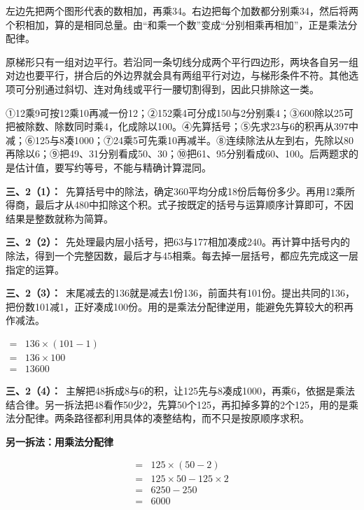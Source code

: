 \documentclass[multi=snippet,border=0pt]{standalone}
\newenvironment{snippet}[3]{\begin{minipage}{#1bp}\color{answerred}\fontsize{#2}{#3}\selectfont\raggedright}{\end{minipage}}
\begin{document}
\begin{snippet}{505}{11.5}{14}左边先把两个图形代表的数相加，再乘34。右边把每个加数都分别乘34，然后将两个积相加，算的是相同总量。由“和乘一个数”变成“分别相乘再相加”，正是乘法分配律。\end{snippet}
\begin{snippet}{505}{11.5}{14}原梯形只有一组对边平行。若沿同一条切线分成两个平行四边形，两块各自另一组对边也要平行，拼合后的外边界就会具有两组平行对边，与梯形条件不符。其他选项可分别通过斜切、连对角线或平行一腰切割得到，因此只排除这一类。\end{snippet}
\begin{snippet}{505}{11.5}{14}①12乘9可按12乘10再减一份12；②152乘4可分成150与2分别乘4；③600除以25可把被除数、除数同时乘4，化成除以100。④先算括号；⑤先求23与6的积再从397中减；⑥125与8凑1000；⑦24乘5可先乘10再减半。⑧连续除法从左到右，先除以80再除以6；⑨把49、31分别看成50、30；⑩把61、95分别看成60、100。后两题求的是估计值，要写约等号，不能与精确计算混同。\end{snippet}
\begin{snippet}{505}{11.5}{14}\textbf{三、2（1）：}\ 先算括号中的除法，确定360平均分成18份后每份多少。再用12乘所得商，最后才从480中扣除这个积。式子按既定的括号与运算顺序计算即可，不因结果是整数就称为简算。\end{snippet}
\begin{snippet}{505}{11.5}{14}\textbf{三、2（2）：}\ 先处理最内层小括号，把63与177相加凑成240。再计算中括号内的除法，得到一个完整因数，最后才与45相乘。每去掉一层括号，都应先完成这一层指定的运算。\end{snippet}
\begin{snippet}{505}{11.5}{14}\textbf{三、2（3）：}\ 末尾减去的136就是减去1份136，前面共有101份。提出共同的136，把份数101减1，正好凑成100份。用的是乘法分配律逆用，能避免先算较大的积再作减法。\end{snippet}
\begin{snippet}{157.0}{10.5}{12.8}\(\begin{aligned}={}&136\times(101-1)\\={}&136\times100\\={}&13600\end{aligned}\)\end{snippet}
\begin{snippet}{505}{11.5}{14}\textbf{三、2（4）：}\ 主解把48拆成8与6的积，让125先与8凑成1000，再乘6，依据是乘法结合律。另一拆法把48看作50少2，先算50个125，再扣掉多算的2个125，用的是乘法分配律。两条路径都利用具体的凑整结构，而不只是按原顺序求积。\par \textbf{另一拆法：用乘法分配律}\par \[\begin{aligned}={}&125\times(50-2)\\={}&125\times50-125\times2\\={}&6250-250\\={}&6000\end{aligned}\]\end{snippet}
\end{document}
